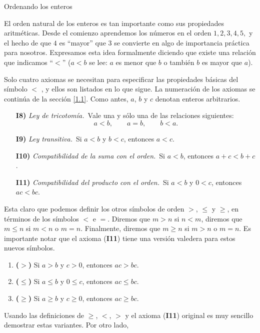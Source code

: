 \begin{section}{Ordenando los enteros}\label{1.2}

El orden natural de los enteros es tan importante como sus propiedades aritméticas. Desde el comienzo aprendemos los números en el orden $1, 2, 3, 4, 5,$ y el hecho de que $4$ es ``mayor'' que $3$ se convierte en algo de importancia práctica para nosotros. Expresamos esta idea formalmente diciendo que existe una relación que indicamos ``$<$'' ($a < b$ se lee: $a$ es menor que $b$ o también $b$ es mayor que $a$). 

Solo cuatro axiomas se necesitan para especificar las propiedades básicas del símbolo $<$ , y ellos son listados en lo que sigue. La numeración de los axiomas se continúa de la sección \ref{1.1}. Como antes, $a$, $b$ y $c$ denotan enteros arbitrarios.

\begin{enumerate}
\item[\textbf{I8)}] {\em Ley de tricotomía.}\, Vale una y sólo una de las relaciones
siguientes:
$$
a<b, \qquad a = b, \qquad b < a.
$$
\item[\textbf{I9)}] {\em Ley transitiva.}\, Si $a< b$ y $b < c$, entonces $a<c$.
\item[\textbf{I10)}] {\em Compatibilidad de la suma con el orden.}\, Si $a < b$, entonces $a+c < b+c$. 
\item[\textbf{I11)}] {\em Compatibilidad del producto con el orden.}\, Si $a< b$ y $0< c$, entonces $ac < bc$. 
\end{enumerate}


Esta claro que podemos definir los otros símbolos de orden $>$, $\le$ y $\ge$, en términos de los símbolos $<$ e $=$. Diremos que $m>n$ si  $n<m$, diremos que $m \le n$ si $m<n$ o $m=n$. Finalmente, diremos que $m \ge n$ si $m > n$ o $m=n$.  Es importante notar que el  axioma (\textbf{I11}) tiene una versión valedera para estos nuevos símbolos.
\begin{enumerate}[label=(\alph*)]
\item \textbf{($>$)} Si $a > b$ y $c>0$, entonces $ac > bc$.
\item \textbf{($\le$)} Si $a \le b$ y $0 \le c$, entonces $ac \le bc$.
\item \textbf{($\ge$)} Si $a\ge b$ y $c\ge 0$, entonces $ac \ge bc$.
\end{enumerate}
Usando las definiciones de $\ge$, $<$, $>$ y el axioma (\textbf{I11}) original es muy sencillo demostrar estas variantes. Por otro lado,


\end{section}

